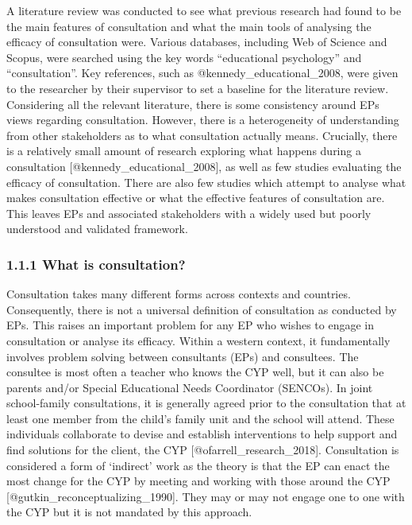 \documentclass[
]{article}
\begin{document}
A literature review was conducted to see what previous research had
found to be the main features of consultation and what the main tools of
analysing the efficacy of consultation were. Various databases,
including Web of Science and Scopus, were searched using the key words
``educational psychology'' and ``consultation''. Key references, such as
@kennedy\_educational\_2008, were given to the researcher by their
supervisor to set a baseline for the literature review. Considering all
the relevant literature, there is some consistency around EPs views
regarding consultation. However, there is a heterogeneity of
understanding from other stakeholders as to what consultation actually
means. Crucially, there is a relatively small amount of research
exploring what happens during a consultation
{[}@kennedy\_educational\_2008{]}, as well as few studies evaluating the
efficacy of consultation. There are also few studies which attempt to
analyse what makes consultation effective or what the effective features
of consultation are. This leaves EPs and associated stakeholders with a
widely used but poorly understood and validated framework.

\hypertarget{what-is-consultation}{%
\subsubsection{1.1.1 What is consultation?}\label{what-is-consultation}}

Consultation takes many different forms across contexts and countries.
Consequently, there is not a universal definition of consultation as
conducted by EPs. This raises an important problem for any EP who wishes
to engage in consultation or analyse its efficacy. Within a western
context, it fundamentally involves problem solving between consultants
(EPs) and consultees. The consultee is most often a teacher who knows
the CYP well, but it can also be parents and/or Special Educational
Needs Coordinator (SENCOs). In joint school-family consultations, it is
generally agreed prior to the consultation that at least one member from
the child's family unit and the school will attend. These individuals
collaborate to devise and establish interventions to help support and
find solutions for the client, the CYP {[}@ofarrell\_research\_2018{]}.
Consultation is considered a form of `indirect' work as the theory is
that the EP can enact the most change for the CYP by meeting and working
with those around the CYP {[}@gutkin\_reconceptualizing\_1990{]}. They
may or may not engage one to one with the CYP but it is not mandated by
this approach.
\end{document}
